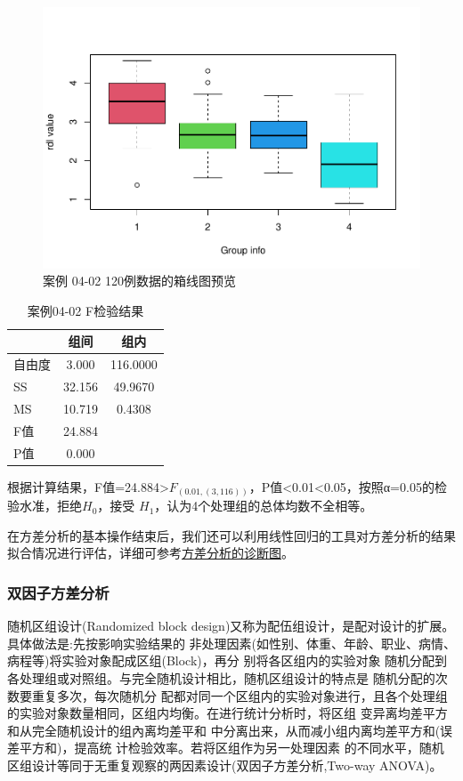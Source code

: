 \documentclass[
]{article}
\begin{document}
\begin{figure}

{\centering \includegraphics[width=0.6\linewidth]{figs/Cmdftest} 

}

\caption{案例 04-02 120例数据的箱线图预览}\label{fig:Cmdftest}
\end{figure}

\begin{table}

\caption{\label{tab:tab2}案例04-02 F检验结果}
\centering
\begin{tabular}[t]{lcc}
\toprule
  & 组间 & 组内\\
\midrule
自由度 & 3.000 & 116.0000\\
SS & 32.156 & 49.9670\\
MS & 10.719 & 0.4308\\
F值 & 24.884 & \\
P值 & 0.000 & \\
\bottomrule
\end{tabular}
\end{table}

根据计算结果，F值=24.884\textgreater{}\(F_{(0.01,(3,116))}\)，P值\textless0.01\textless0.05，按照α=0.05的检验水准，拒绝\(H_0\)，接受
\(H_1\)，认为4个处理组的总体均数不全相等。

在方差分析的基本操作结束后，我们还可以利用线性回归的工具对方差分析的结果拟合情况进行评估，详细可参考\protect\hyperlink{ux65b9ux5deeux5206ux6790ux7684ux8bcaux65adux56fe}{方差分析的诊断图}。

\hypertarget{ux53ccux56e0ux5b50ux65b9ux5deeux5206ux6790}{%
\subsubsection{双因子方差分析}\label{ux53ccux56e0ux5b50ux65b9ux5deeux5206ux6790}}

随机区组设计(Randomized block design)又称为配伍组设计，是配对设计的扩展。具体做法是:先按影响实验结果的
非处理因素(如性别、体重、年龄、职业、病情、病程等)将实验对象配成区组(Block)，再分 别将各区组内的实验对象
随机分配到各处理组或对照组。与完全随机设计相比，随机区组设计的特点是 随机分配的次数要重复多次，每次随机分
配都对同一个区组内的实验对象进行，且各个处理组的实验对象数量相同，区组内均衡。在进行统计分析时，将区组
变异离均差平方和从完全随机设计的组內离均差平和 中分离出来，从而减小组内离均差平方和(误差平方和)，提高统
计检验效率。若将区组作为另一处理因素 的不同水平，随机区组设计等同于无重复观察的两因素设计(双因子方差分析,Two-way ANOVA)。
\end{document}
